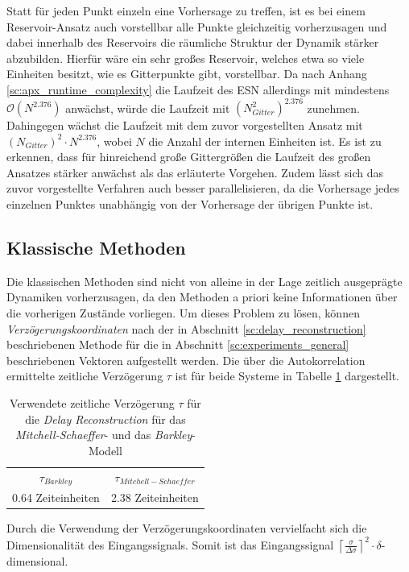 Statt für jeden Punkt einzeln eine Vorhersage zu treffen, ist es bei einem Reservoir-Ansatz auch vorstellbar alle Punkte gleichzeitig vorherzusagen und dabei innerhalb des Reservoirs die räumliche Struktur der Dynamik stärker abzubilden. Hierfür wäre ein sehr großes Reservoir, welches etwa so viele Einheiten besitzt, wie es Gitterpunkte gibt, vorstellbar. Da nach Anhang \ref{sc:apx_runtime_complexity} die Laufzeit des \textsc{ESN} allerdings mit mindestens $\mathcal{O}(N^{2.376})$ anwächst, würde die Laufzeit mit $(N_{Gitter}^2)^{2.376}$ zunehmen. Dahingegen wächst die Laufzeit mit dem zuvor vorgestellten Ansatz mit $(N_{Gitter})^2 \cdot N^{2.376}$, wobei $N$ die Anzahl der internen Einheiten ist. Es ist zu erkennen, dass für hinreichend große Gittergrößen die Laufzeit des großen Ansatzes stärker anwächst als das erläuterte Vorgehen. Zudem lässt sich das zuvor vorgestellte Verfahren auch besser parallelisieren, da die Vorhersage jedes einzelnen Punktes unabhängig von der Vorhersage der übrigen Punkte ist.   

\FloatBarrier
\subsection{Klassische Methoden}
\label{sec:experiments_general_classical}
Die klassischen Methoden sind nicht von alleine in der Lage zeitlich ausgeprägte Dynamiken vorherzusagen, da den Methoden a priori keine Informationen über die vorherigen Zustände vorliegen. Um dieses Problem zu lösen, können \textit{Verzögerungskoordinaten} nach der in Abschnitt \ref{sc:delay_reconstruction} beschriebenen Methode für die in Abschnitt \ref{sc:experiments_general} beschriebenen Vektoren aufgestellt werden. Die über die Autokorrelation ermittelte zeitliche Verzögerung $\tau$ ist für beide Systeme in Tabelle \ref{tab:delay_reconstruction_tau} dargestellt.     

\begin{table}[h]
\centering
\begin{tabular}{cc}
\hline
$\tau_{Barkley}$ & $\tau_{Mitchell-Schaeffer}$ \\ 
0.64 Zeiteinheiten & 2.38 Zeiteinheiten\\ 
\hline 
\end{tabular} 
\caption{Verwendete zeitliche Verzögerung $\tau$ für die \textit{Delay Reconstruction} für das \textit{Mitchell-Schaeffer}- und das \textit{Barkley}-Modell}
\label{tab:delay_reconstruction_tau}
\end{table} 

Durch die Verwendung der Verzögerungskoordinaten vervielfacht sich die Dimensionalität des Eingangssignals. Somit ist das Eingangssignal $\left \lceil \frac{\sigma}{\Delta\sigma} \right \rceil^2 \cdot \delta$-dimensional. 



